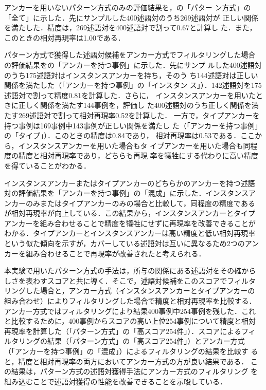 \documentclass[japanese]{jnlp_1.4}
\begin{document}
アンカーを用いないパターン方式のみの評価結果を，の「パター
ン方式」の「全て」に示した．先にサンプルした400述語対のうち269述語対が
正しい関係を満たした．精度は，269述語対を400述語対で割って0.67と計算し
た．また，このときの相対再現率は1.00である．

パターン方式で獲得した述語対候補をアンカー方式でフィルタリングした場合
の評価結果をの「アンカーを持つ事例」に示した．先にサンプ
ルした400述語対のうち175述語対はインスタンスアンカーを持ち，そのう
ち144述語対は正しい関係を満たした（「アンカーを持つ事例」の「インスタン
ス」）．142述語対を175述語対で割って精度0.81を計算した．さらに，
インスタンスアンカーを用いたときに正しく関係を満たす144事例を，評価し
た400述語対のうち正しく関係を満たす269述語対で割って相対再現率0.52を計算した．
一方で，タイプアンカーを持つ事例は169事例中143事例が正しい関係を満たし
た（「アンカーを持つ事例」の「タイプ」）．このときの精度は0.84であり，
相対再現率は0.53である．ここから，インスタンスアンカーを用いた場合もタ
イプアンカーを用いた場合も同程度の精度と相対再現率であり，どちらも再現
率を犠牲にする代わりに高い精度を得ていることがわかる．

インスタンスアンカーまたはタイプアンカーのどちらかのアンカーを持つ述語
対の評価結果を「アンカーを持つ事例」の「混成」に示した．インスタンスア
ンカーのみまたはタイプアンカーのみの場合と比較して，同程度の精度である
が相対再現率が向上している．この結果から，インスタンスアンカーとタイプ
アンカーを組み合わせることで精度を犠牲にせずに再現率を改善できることが
わかる．タイプアンカーとインスタンスアンカーは高い精度と低い相対再現率
という似た傾向を示すが，カバーしている述語対は互いに異なるため2つのアン
カーを組み合わせることで再現率が改善されたと考えられる．

本実験で用いたパターン方式の手法は，所与の関係にある述語対をその確から
しさを表わすスコアと共に導く．そこで，述語対候補をこのスコアでフィルタ
リングした場合と，アンカー方式（インスタンスアンカーとタイプアンカーの
組み合わせ）によりフィルタリングした場合で精度と相対再現率を比較する．
アンカー方式ではフィルタリングにより結果400事例中254事例を残した．これ
と比較するために，400事例からスコアの高い上位254事例について精度と相対
再現率を計算した（「パターン方式」の「高スコア254件」）．スコアによるフィ
ルタリングの結果（「パターン方式」の「高スコア254件」）とアンカー方式
（「アンカーを持つ事例」の「混成」）によるフィルタリングの結果を比較す
ると，精度と相対再現率の両方においてアンカー方式の方が良い結果である．
この結果は，パターン方式の述語対獲得手法にアンカー方式のフィルタリング
を組み込むことで述語対獲得の性能を改善できることを示唆している．
\end{document}
